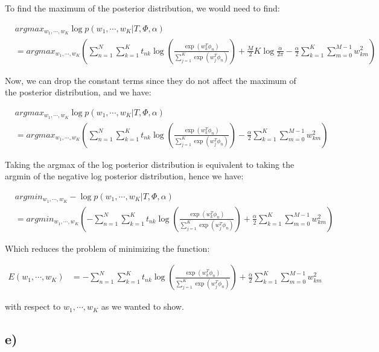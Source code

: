 \documentclass[12pt,a4paper,oneside]{paper}
\begin{document}
To find the maximum of the posterior distribution, we would need to find:

\begin{align*}
    &argmax_{w_1, \cdots, w_K} \log p(w_1, \cdots, w_K | T, \Phi, \alpha) \\
    &= argmax_{w_1, \cdots, w_K} \left(\sum_{n=1}^{N} \sum_{k=1}^{K} t_{nk} \log \left(\frac{\exp(w_k^T \phi_n)}{\sum_{j=1}^{K} \exp(w_j^T \phi_n)}\right) + \frac{M}{2} K \log \frac{\alpha}{2\pi} - \frac{\alpha}{2} \sum_{k=1}^{K} \sum_{m=0}^{M - 1} w_{km}^2\right)
\end{align*}

Now, we can drop the constant terms since they do not affect the maximum of the posterior distribution, and we have:

\begin{align*}
    &argmax_{w_1, \cdots, w_K} \log p(w_1, \cdots, w_K | T, \Phi, \alpha) \\
    &= argmax_{w_1, \cdots, w_K} \left(\sum_{n=1}^{N} \sum_{k=1}^{K} t_{nk} \log \left(\frac{\exp(w_k^T \phi_n)}{\sum_{j=1}^{K} \exp(w_j^T \phi_n)}\right) - \frac{\alpha}{2} \sum_{k=1}^{K} \sum_{m=0}^{M - 1} w_{km}^2\right)
\end{align*}

Taking the argmax of the log posterior distribution is equivalent to taking the argmin of the negative log posterior distribution, hence we have:

\begin{align*}
    &argmin_{w_1, \cdots, w_K} -\log p(w_1, \cdots, w_K | T, \Phi, \alpha) \\
    &= argmin_{w_1, \cdots, w_K} \left(-\sum_{n=1}^{N} \sum_{k=1}^{K} t_{nk} \log \left(\frac{\exp(w_k^T \phi_n)}{\sum_{j=1}^{K} \exp(w_j^T \phi_n)}\right) + \frac{\alpha}{2} \sum_{k=1}^{K} \sum_{m=0}^{M - 1} w_{km}^2\right)
\end{align*}

Which reduces the problem of minimizing the function: 

\begin{align*}
    E(w_1, \cdots, w_K) &= -\sum_{n=1}^{N} \sum_{k=1}^{K} t_{nk} \log \left(\frac{\exp(w_k^T \phi_n)}{\sum_{j=1}^{K} \exp(w_j^T \phi_n)}\right) + \frac{\alpha}{2} \sum_{k=1}^{K} \sum_{m=0}^{M - 1} w_{km}^2
\end{align*}

with respect to $w_1, \cdots, w_K$ as we wanted to show.

\subsection{e)}
\end{document}

